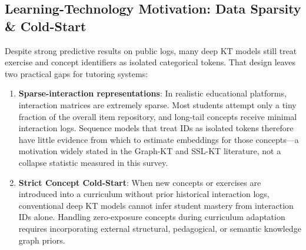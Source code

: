 \documentclass[lettersize,journal]{IEEEtran}
\begin{document}
\subsection{Learning-Technology Motivation: Data Sparsity \& Cold-Start}
Despite strong predictive results on public logs, many deep KT models still treat exercise and concept identifiers as isolated categorical tokens. That design leaves two practical gaps for tutoring systems:
\begin{enumerate}
    \item \textbf{Sparse-interaction representations}: In realistic educational platforms, interaction matrices are extremely sparse. Most students attempt only a tiny fraction of the overall item repository, and long-tail concepts receive minimal interaction logs. Sequence models that treat IDs as isolated tokens therefore have little evidence from which to estimate embeddings for those concepts---a motivation widely stated in the Graph-KT and SSL-KT literature, not a collapse statistic measured in this survey.
    \item \textbf{Strict Concept Cold-Start}: When new concepts or exercises are introduced into a curriculum without prior historical interaction logs, conventional deep KT models cannot infer student mastery from interaction IDs alone. Handling zero-exposure concepts during curriculum adaptation requires incorporating external structural, pedagogical, or semantic knowledge graph priors.
\end{enumerate}
\end{document}
